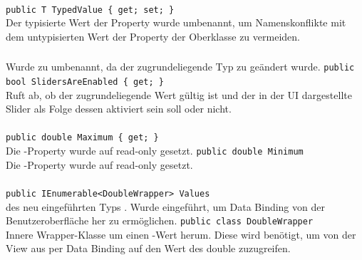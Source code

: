 \paragraph{}
\begin{itemize}
	\change \verb!public T TypedValue { get; set; }! \\
	Der typisierte Wert der Property wurde umbenannt, um Namenskonflikte mit dem untypisierten Wert der Property der Oberklasse zu vermeiden.
\end{itemize}
\subsubsection{}

\paragraph{}
\begin{itemize}
	\change Wurde zu  umbenannt, da der zugrundeliegende Typ zu  geändert wurde.
	\add \verb!public bool SlidersAreEnabled { get; }! \\
	Ruft ab, ob der zugrundeliegende Wert gültig ist und der in der UI dargestellte Slider als Folge dessen aktiviert sein soll oder nicht.
\end{itemize}

\paragraph{}
\begin{itemize}
	\change \verb!public double Maximum { get; }! \\
	Die -Property wurde auf read-only gesetzt.
	\change \verb!public double Minimum! \\
	Die -Property wurde auf read-only gesetzt.
\end{itemize}

\paragraph{}
\begin{itemize}
	\add \verb!public IEnumerable<DoubleWrapper> Values! \\
	 des neu eingeführten Typs . Wurde eingeführt, um Data Binding von der Benutzeroberfläche her zu ermöglichen.
	\add \verb!public class DoubleWrapper! \\
	Innere Wrapper-Klasse um einen -Wert herum. Diese wird benötigt, um von der View aus per Data Binding auf den Wert des double zuzugreifen.
\end{itemize}


